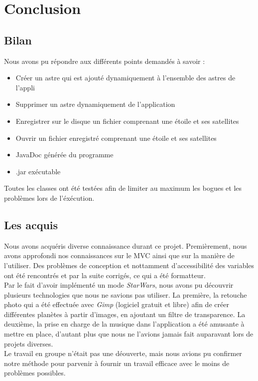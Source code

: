 \documentclass[a4paper,10pt]{article}
\begin{document}
\newpage
\newpage
\section{Conclusion}
\subsection{Bilan}
Nous avons pu répondre aux différents points demandés à savoir :
\begin{itemize}
 \item Créer un astre qui est ajouté dynamiquement à l'ensemble des astres de l'appli
 \item Supprimer un astre dynamiquement de l'application
 \item Enregistrer sur le disque un fichier comprenant une étoile et ses satellites
 \item Ouvrir un fichier enregistré comprenant une étoile et ses satellites
 \item JavaDoc générée du programme
 \item .jar exécutable
\end{itemize}

Toutes les classes ont été testées afin de limiter au maximum les bogues et les problèmes lors de l'éxécution.


\subsection{Les acquis}
Nous avons acquéris diverse connaissance durant ce projet. Premièrement, nous avons approfondi nos connaissances sur le MVC ainsi que sur la manière de l'utiliser. Des problèmes de conception et nottamment d'accessibilité des variables ont été rencontrés et par la suite corrigés, ce qui a été formatteur.
\\

Par le fait d'avoir implémenté un mode \textit{StarWars}, nous avons pu découvrir plusieurs technologies que nous ne savions pas utiliser. La première, la retouche photo qui a été effectuée avec \textit{Gimp} (logiciel gratuit et libre) afin de créer différentes planètes à partir d'images, en ajoutant un filtre de transparence. La deuxième, la prise en charge de la musique dans l'application a été amusante à mettre en place, d'autant plus que nous ne l'avions jamais fait auparavant lors de projets diverses.
\\

Le travail en groupe n'était pas une déouverte, mais nous avions pu confirmer notre méthode pour parvenir à fournir un travail efficace avec le moins de problèmes possibles.
\end{document}
